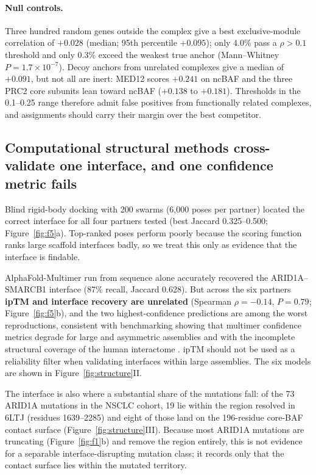 \documentclass[11pt,a4paper]{article}
\begin{document}
\paragraph{Null controls.} Three hundred random genes outside the complex give a
best exclusive-module correlation of $+0.028$ (median; 95th percentile $+0.095$);
only 4.0\% pass a $\rho > 0.1$ threshold and only 0.3\% exceed the weakest true
anchor (Mann--Whitney $P = 1.7\times10^{-7}$). Decoy anchors from unrelated
complexes give a median of $+0.091$, but not all are inert: MED12 scores $+0.241$
on ncBAF and the three PRC2 core subunits lean toward ncBAF ($+0.138$ to
$+0.181$). Thresholds in the 0.1--0.25 range therefore admit false positives from
functionally related complexes, and assignments should carry their margin over
the best competitor.

\subsection{Computational structural methods cross-validate one interface, and one
confidence metric fails}

Blind rigid-body docking \citep{jimenez2018} with 200 swarms (6{,}000 poses per
partner) located the correct interface for all four partners tested (best Jaccard
0.325--0.500; Figure~\ref{fig:f5}a). Top-ranked poses perform poorly because the
scoring function ranks large scaffold interfaces badly, so we treat this only as
evidence that the interface is findable.

AlphaFold-Multimer \citep{jumper2021,evans2024,mirdita2022} run from sequence alone
accurately recovered the ARID1A--SMARCB1 interface (87\% recall, Jaccard 0.628).
But across the six partners \textbf{ipTM and interface recovery are unrelated}
(Spearman $\rho = -0.14$, $P = 0.79$; Figure~\ref{fig:f5}b), and the two
highest-confidence predictions are among the worst reproductions, consistent with
benchmarking showing that multimer confidence metrics degrade for large and
asymmetric assemblies \citep{zhu2023af,bibppi2023} and with the incomplete
structural coverage of the human interactome \citep{bibinteractome}. ipTM should
not be used as a reliability filter when validating interfaces within large
assemblies. The six models are shown in Figure~\ref{fig:structure}II.

The interface is also where a substantial share of the mutations fall: of the 73
ARID1A mutations in the NSCLC cohort, 19 lie within the region resolved in 6LTJ
(residues 1639--2285) and eight of those land on the 196-residue core-BAF contact
surface (Figure~\ref{fig:structure}III). Because most ARID1A mutations are
truncating (Figure~\ref{fig:f1}b) and remove the region entirely, this is not
evidence for a separable interface-disrupting mutation class; it records only
that the contact surface lies within the mutated territory.
\end{document}
